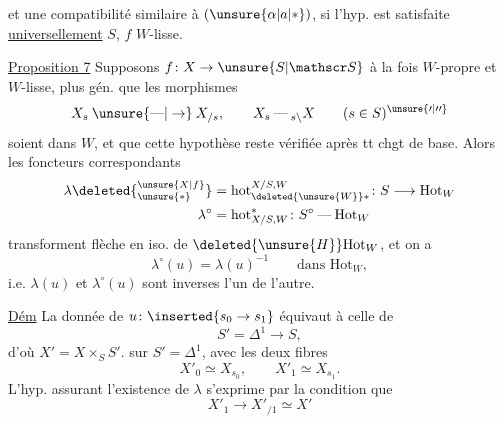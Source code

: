 
et une compatibilité similaire à $(\unsure{\alpha|a|*})$, si l'hyp. est satisfaite \uline{universellement}  $S$,  $f$ $W$-lisse.

\uline{Proposition 7} Supposons $f\colon X\to\unsure{S|\mathscr S}$ à la fois $W$-propre et $W$-lisse, plus gén. que les morphismes
\[
X_s\mathbin{\unsure{\text{---}|\to}}X_{/s},\qquad X_s\mathbin{\text{---}}{}_{s\backslash}X\qquad(s\in S)^{\unsure{\prime|\prime\prime}}
\]
soient dans $W$, et que cette hypothèse reste vérifiée après tt chgt de base. Alors les foncteurs correspondants
\[
\begin{aligned}
\lambda\deleted{^{\unsure{X|f}}_{\unsure{*}}}&=\mathrm{hot}^{X/S,W}_{\deleted{\unsure{W}}*}\colon S\longrightarrow\mathrm{Hot}_W\\
\lambda^\circ&=\mathrm{hot}_{X/S,W}^{*}\colon S^\circ\mathbin{\text{---}}\mathrm{Hot}_W
\end{aligned}
\]
transforment  flèche  en iso. de $\deleted{\unsure{H}}\mathrm{Hot}_W$, et on a
\[
\lambda^\circ(u)=\lambda(u)^{-1}\qquad\text{dans }\mathrm{Hot}_W,
\]
i.e. $\lambda(u)$ et $\lambda^\circ(u)$ sont inverses l'un de l'autre.

\uline{Dém} La donnée de $u\colon\inserted{s_0\to s_1}$ équivaut à celle de
\[
S'=\mathbb{\Delta}^1\longrightarrow S,
\]
d'où $X'=X\times_S S'$. sur $S'=\mathbb{\Delta}^1$, avec les deux fibres
\[
X'_0\simeq X_{s_0},\qquad X'_1\simeq X_{s_1}.
\]
L'hyp. assurant l'existence de $\lambda$ s'exprime par la condition que
\[
X'_1\longrightarrow X'_{/1}\simeq X'
\]

